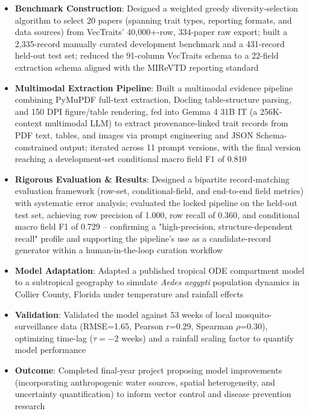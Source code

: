 \documentclass{my-resume}
\begin{document}
\begin{itemize}[parsep=0.2ex]
  \item \textbf{Benchmark Construction}: Designed a weighted greedy diversity-selection algorithm to select 20 papers (spanning trait types, reporting formats, and data sources) from VecTraits' 40,000+-row, 334-paper raw export; built a 2,335-record manually curated development benchmark and a 431-record held-out test set; reduced the 91-column VecTraits schema to a 22-field extraction schema aligned with the MIReVTD reporting standard
  \item \textbf{Multimodal Extraction Pipeline}: Built a multimodal evidence pipeline combining PyMuPDF full-text extraction, Docling table-structure parsing, and 150 DPI figure/table rendering, fed into Gemma 4 31B IT (a 256K-context multimodal LLM) to extract provenance-linked trait records from PDF text, tables, and images via prompt engineering and JSON Schema-constrained output; iterated across 11 prompt versions, with the final version reaching a development-set conditional macro field F1 of 0.810
  \item \textbf{Rigorous Evaluation \& Results}: Designed a bipartite record-matching evaluation framework (row-set, conditional-field, and end-to-end field metrics) with systematic error analysis; evaluated the locked pipeline on the held-out test set, achieving row precision of 1.000, row recall of 0.360, and conditional macro field F1 of 0.729 -- confirming a "high-precision, structure-dependent recall" profile and supporting the pipeline's use as a candidate-record generator within a human-in-the-loop curation workflow
\end{itemize}

\begin{itemize}[parsep=0.2ex]
  \item \textbf{Model Adaptation}: Adapted a published tropical ODE compartment model to a subtropical geography to simulate \textit{Aedes aegypti} population dynamics in Collier County, Florida under temperature and rainfall effects
  \item \textbf{Validation}: Validated the model against 53 weeks of local mosquito-surveillance data (RMSE=1.65, Pearson r=0.29, Spearman $\rho$=0.30), optimizing time-lag ($\tau=-2$ weeks) and a rainfall scaling factor to quantify model performance
  \item \textbf{Outcome}: Completed final-year project proposing model improvements (incorporating anthropogenic water sources, spatial heterogeneity, and uncertainty quantification) to inform vector control and disease prevention research
\end{itemize}
\end{document}
